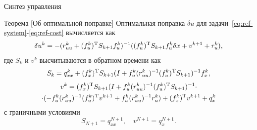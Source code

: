     \begin{frame}{Синтез управления}
        \begin{block}{Теорема [Об оптимальной поправке]}
            Оптимальная поправка $\delta u$ для задачи~\eqref{eq:ref-system}-\eqref{eq:ref-cost} вычисляется как
            \begin{equation*}
                \delta u^k = - (r^k_{uu} + (f^k_u)^{\textnormal{T}} S_{k+1} f^k_u)^{-1} ((f^k_u)^{\textnormal{T}} S_{k+1} f^k_u \delta x + v^{k+1} + r^k_u),
            \end{equation*}
            где $S_k$ и $v^{k}$ высчитываются в обратном времени как
            \begin{equation*}
                    S_k = q^k_{xx} + (f^k_x)^{\textnormal{T}} S_{k+1} (I + f^k_u (r^k_{uu})^{-1} (f^k_u)^{\textnormal{T}} S_{k+1})^{-1} f_x^k,
            \end{equation*}
            \begin{multline*}
                v^k = (f^k_x)^{\textnormal{T}} S_{k+1} ( I + f^k_u (r^k_{uu})^{-1} (f^k_u)^{\textnormal{T}} S_{k+1})^{-1}
                \cdot \\ \cdot
                (-f^k_u (r^k_{uu})^{-1} (f^k_u)^{\textnormal{T}} v^{k+1} + f^k_u (r^k_{uu})^{-1} r^k_u) + (f^k_x)^{\textnormal{T}} v^{k+1} + q^k_x
            \end{multline*}
            с граничными условиями
            \begin{equation*}
                    S_{N+1} = q^{N+1}_{xx},
                    \quad
                    v^{N+1} = q^{N+1}_{x}.
            \end{equation*}
        \end{block}
    \end{frame}
    

